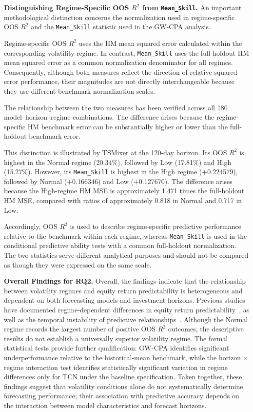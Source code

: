 \documentclass[runningheads,orivec]{llncs}
\begin{document}
\noindent\textbf{Distinguishing Regime-Specific OOS $R^2$ from \texttt{Mean\_Skill}.}
An important methodological distinction concerns the normalization used in regime-specific OOS $R^2$ and the \texttt{Mean\_Skill} statistic used in the GW-CPA analysis.

Regime-specific OOS $R^2$ uses the HM mean squared error calculated within the corresponding volatility regime. In contrast, \texttt{Mean\_Skill} uses the full-holdout HM mean squared error as a common normalization denominator for all regimes. Consequently, although both measures reflect the direction of relative squared-error performance, their magnitudes are not directly interchangeable because they use different benchmark normalization scales.

The relationship between the two measures has been verified across all 180 model--horizon--regime combinations. The difference arises because the regime-specific HM benchmark error can be substantially higher or lower than the full-holdout benchmark error.

This distinction is illustrated by TSMixer at the 120-day horizon. Its OOS $R^2$ is highest in the Normal regime (20.34\%), followed by Low (17.81\%) and High (15.27\%). However, its \texttt{Mean\_Skill} is highest in the High regime ($+$0.224579), followed by Normal ($+$0.166346) and Low ($+$0.127670). The difference arises because the High-regime HM MSE is approximately 1.471 times the full-holdout HM MSE, compared with ratios of approximately 0.818 in Normal and 0.717 in Low.

Accordingly, OOS $R^2$ is used to describe regime-specific predictive performance relative to the benchmark within each regime, whereas \texttt{Mean\_Skill} is used in the conditional predictive ability tests with a common full-holdout normalization. The two statistics serve different analytical purposes and should not be compared as though they were expressed on the same scale.

\medskip
\noindent\textbf{Overall Findings for RQ2.}
Overall, the findings indicate that the relationship between volatility regimes and equity return predictability is heterogeneous and dependent on both forecasting models and investment horizons. Previous studies have documented regime-dependent differences in equity return predictability~\cite{baltas2018,hammerschmid2018}, as well as the temporal instability of predictive relationships~\cite{giacomini2010,harvey2021,paye2006}. Although the Normal regime records the largest number of positive OOS $R^2$ outcomes, the descriptive results do not establish a universally superior volatility regime. The formal statistical tests provide further qualification: GW-CPA identifies significant underperformance relative to the historical-mean benchmark, while the horizon $\times$ regime interaction test identifies statistically significant variation in regime differences only for TCN under the baseline specification. Taken together, these findings suggest that volatility conditions alone do not systematically determine forecasting performance; their association with predictive accuracy depends on the interaction between model characteristics and forecast horizons.
\end{document}
